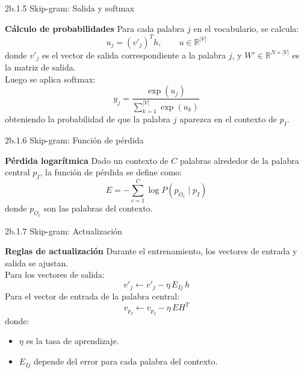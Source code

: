 \documentclass{beamer}
\begin{document}
\begin{frame}[fragile]{2b.1.5 Skip-gram: Salida y softmax}
	\begin{block}{\textbf{Cálculo de probabilidades}}
		\justifying
		Para cada palabra $j$ en el vocabulario, se calcula:
		\[
		u_j = (v'_j)^T h, \qquad u \in \mathbb{R}^{|V|}
		\]
		donde $v'_j$ es el vector de salida correspondiente a la palabra $j$, 
		y $W' \in \mathbb{R}^{N \times |V|}$ es la matriz de salida.\\
		\vspace{0.2cm}
		Luego se aplica softmax:
		\[
		y_j = \frac{\exp(u_j)}{\sum_{k=1}^{|V|} \exp(u_k)}
		\]
		obteniendo la probabilidad de que la palabra $j$ aparezca en el contexto de $p_I$.
	\end{block}
\end{frame}

\begin{frame}[fragile]{2b.1.6 Skip-gram: Función de pérdida}
	\begin{block}{\textbf{Pérdida logarítmica}}
		\justifying
		Dado un contexto de $C$ palabras alrededor de la palabra central $p_I$, 
		la función de pérdida se define como:
		\[
		E = - \sum_{c=1}^{C} \log P(p_{O_c} \mid p_I)
		\]
		donde $p_{O_c}$ son las palabras del contexto.\\
		\vspace{0.2cm}
	\end{block}
\end{frame}

\begin{frame}[fragile]{2b.1.7 Skip-gram: Actualización}
	\begin{block}{\textbf{Reglas de actualización}}
		\justifying
		Durante el entrenamiento, los vectores de entrada y salida se ajustan.\\
		\vspace{0.2cm}
		Para los vectores de salida:
		\[
		v'_j \leftarrow v'_j - \eta \, E_{Ij} \, h
		\]
		Para el vector de entrada de la palabra central:
		\[
		v_{p_I} \leftarrow v_{p_I} - \eta \, EH^T
		\]
		donde:
		\begin{itemize}
			\item $\eta$ es la tasa de aprendizaje.
			\item $E_{Ij}$ depende del error para cada palabra del contexto.
		\end{itemize}
	\end{block}
	
\end{frame}
\end{document}
